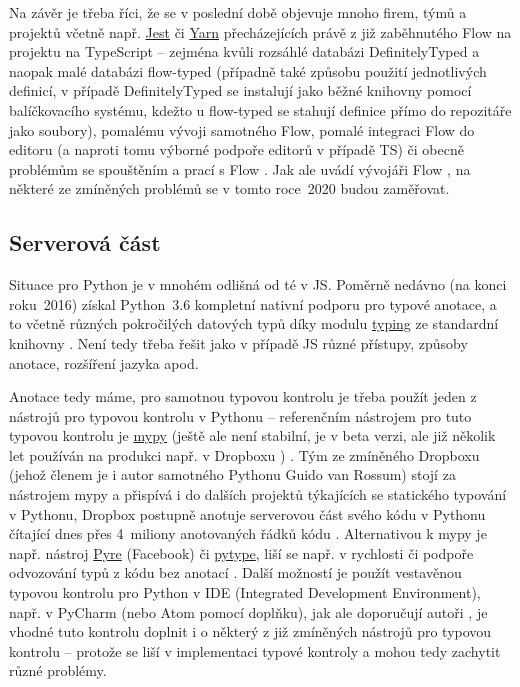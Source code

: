 Na závěr je třeba říci, že se v poslední době objevuje mnoho firem, týmů a projektů včetně např. \href{https://jestjs.io/}{Jest} či \href{https://yarnpkg.com/}{Yarn} přecházejících právě z již zaběhnutého Flow na projektu na TypeScript -- zejména kvůli rozsáhlé databázi DefinitelyTyped a naopak malé databázi flow-typed (případně také způsobu použití jednotlivých definicí, v případě DefinitelyTyped se instalují jako běžné knihovny pomocí balíčkovacího systému, kdežto u flow-typed se stahují definice přímo do repozitáře jako soubory), pomalému vývoji samotného Flow, pomalé integraci Flow do editoru (a naproti tomu výborné podpoře editorů v případě TS) či obecně problémům se spouštěním a prací s Flow \cite{types-flow1, types-flow2, types-flow3}. Jak ale uvádí vývojáři Flow \cite{types-flow4}, na některé ze zmíněných problémů se v tomto roce~2020 budou zaměřovat.


\subsection{Serverová část}\label{subsec:staticketypovani-serverovacast}

Situace pro Python je v mnohém odlišná od té v JS. Poměrně nedávno (na konci roku~2016) získal Python~3.6 kompletní nativní podporu pro typové anotace, a to včetně různých pokročilých datových typů díky modulu \href{https://docs.python.org/3/library/typing.html}{typing} ze standardní knihovny \cite{types-python-bernat}. Není tedy třeba řešit jako v případě JS různé přístupy, způsoby anotace, rozšíření jazyka apod.

Anotace tedy máme, pro samotnou typovou kontrolu je třeba použít jeden z nástrojů pro typovou kontrolu v Pythonu -- referenčním nástrojem pro tuto typovou kontrolu je \href{http://mypy-lang.org/}{mypy} (ještě ale není stabilní, je v beta verzi, ale již několik let používán na produkci např. v Dropboxu \cite{mypy}) \cite{types-python-bernat}. Tým ze zmíněného Dropboxu (jehož členem je i autor samotného Pythonu Guido van Rossum) stojí za nástrojem mypy a přispívá i do dalších projektů týkajících se statického typování v Pythonu, Dropbox postupně anotuje serverovou část svého kódu v Pythonu čítající dnes přes 4~miliony anotovaných řádků kódu \cite{types-python-dropbox}. Alternativou k mypy je např. nástroj \href{https://github.com/facebook/pyre-check}{Pyre} (Facebook) či \href{https://github.com/google/pytype}{pytype}, liší se např. v rychlosti či podpoře odvozování typů z kódu bez anotací \cite{types-python-bernat, types-python-realpython}. Další možností je použít vestavěnou typovou kontrolu pro Python v IDE (Integrated Development Environment), např. v PyCharm (nebo Atom pomocí doplňku), jak ale doporučují autoři \cite{types-python-bernat, types-python-medium}, je vhodné tuto kontrolu doplnit i o některý z již zmíněných nástrojů pro typovou kontrolu -- protože se liší v implementaci typové kontroly a mohou tedy zachytit různé problémy.

